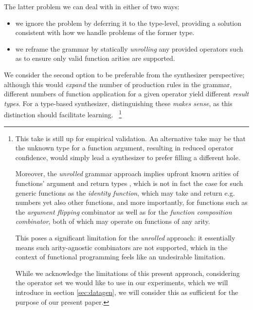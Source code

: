 \documentclass{article}
\begin{document}
The latter problem we can deal with in either of two ways:
\begin{itemize}
    \item we ignore the problem by deferring it to the type-level,
    providing a solution consistent with how we handle problems of the former type.
    \item we reframe the grammar by statically \emph{unrolling} any provided operators such as to ensure only valid function arities are supported.
\end{itemize}

We consider the second option to be preferable from the synthesizer perspective;
although this would \emph{expand} the number of production rules in the grammar,
different numbers of function application for a given operator yield different \emph{result types}.
For a type-based synthesizer, distinguishing these \emph{makes sense},
as this distinction should facilitate learning.%
~\footnote{
    This take is still up for empirical validation.
    An alternative take may be that the unknown type for a function argument,
    resulting in reduced operator confidence,
    would simply lead a synthesizer to prefer filling a different hole.

    Moreover, the \emph{unrolled} grammar approach implies upfront known arities of functions' argument and return types%
    ,
    which is not in fact the case for such generic functions as the \emph{identity function},
    which may take and return e.g. numbers yet also other functions,
    and more importantly, for functions such as the \emph{argument flipping} combinator
    as well as for the \emph{function composition combinator},
    both of which may operate on functions of any arity.

    This poses a significant limitation for the \emph{unrolled} approach:
    it essentially means such arity-agnostic combinators are not supported,
    which in the context of functional programming feels like an undesirable limitation.

    While we acknowledge the limitations of this present approach,
    considering the operator set we would like to use in our experiments,
    which we will introduce in section \ref{sec:datagen},
    we will consider this as sufficient for the purpose of our present paper.

}
\end{document}
